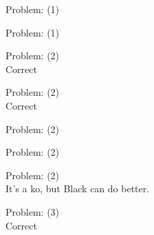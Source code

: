 \documentclass[11pt]{article}
\begin{document}
\begin{minipage}[t]{0.5\textwidth}
  {\centering
  
Problem: (1)\\
  }
\end{minipage}
\begin{minipage}[t]{0.5\textwidth}
  {\centering
  
Problem: (1)\\
  }
\end{minipage}
\begin{minipage}[t]{0.5\textwidth}
  {\centering
  
Problem: (2)\\
Correct\\
  }
\end{minipage}
\begin{minipage}[t]{0.5\textwidth}
  {\centering
  
Problem: (2)\\
Correct\\
  }
\end{minipage}
\begin{minipage}[t]{0.5\textwidth}
  {\centering
  
Problem: (2)\\
  }
\end{minipage}
\begin{minipage}[t]{0.5\textwidth}
  {\centering
  
Problem: (2)\\
  }
\end{minipage}
\begin{minipage}[t]{0.5\textwidth}
  {\centering
  
Problem: (2)\\
It's a ko, but Black can do better.\\
  }
\end{minipage}
\begin{minipage}[t]{0.5\textwidth}
  {\centering
  
Problem: (3)\\
Correct\\
  }
\end{minipage}
\end{document}
